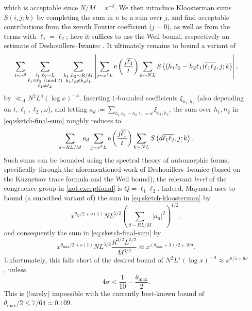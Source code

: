 \documentclass[reqno,11pt]{amsart}
\theoremstyle{definition}
\theoremstyle{remark}
\numberwithin{equation}{section}
\newcommand{\e}{\textnormal{e}}
\renewcommand{\bar}{\overline}
\renewcommand{\pmod}[1]{\ (\textnormal{mod } #1)}
\begin{document}
which is acceptable since $N/M = x^{-\delta}$.
We then introduce Kloosterman sums $S(i, j; k)$ by completing the sum in $n$ to a sum over $j$, and find acceptable contributions from the zeroth Fourier coefficient ($j = 0$), as well as from the terms with $\ell_1 = \ell_2$; here it suffices to use the Weil bound, respectively an estimate of Deshouillers--Iwaniec \cite[Theorem 9]{deshouillers1982kloosterman}. It ultimately remains to bound a variant of
\begin{equation} \label{eq:sketch-final-sum}
    \sum_{t \sim x^\delta}
    \sum_{\substack{\ell_1, \ell_2 \sim L \\ \ell_1 \equiv \ell_2 \pmod{t} \\ \ell_1 \neq \ell_2}}
    \sum_{\substack{h_1, h_2 \sim R/M \\ h_1\ell_2 \neq h_2\ell_1}}
    \left\vert
    \sum_{j \sim x^\delta L} \e\left(\frac{j\bar{\ell_1}}{t}\right)  
    \sum_{k \sim NL}
    S\left((h_1\ell_2 - h_2\ell_1)\bar{\ell_1\ell_2}, j; k\right)\right\vert,
\end{equation}
by $\ll_A N^2 L^4 (\log x)^{-A}$. Inserting $1$-bounded coefficients $\xi_{h_1, h_2}$ (also depending on $t, \ell_1, \ell_2, \omega$), and letting $a_d := \sum_{h_1 \ell_2 - h_2 \ell_1 = d} \xi_{h_1, h_2}$, the sum over $h_1, h_2$ in \cref{eq:sketch-final-sum} roughly reduces to
\begin{equation} \label{eq:sketch-kloosterman}
    \sum_{d \sim RL/M} a_d \sum_{j \sim x^\delta L} \e\left(\frac{j\bar{\ell_1}}{t}\right) 
    \sum_{k \sim NL} S\left(d \bar{\ell_1 \ell_2}, j; k\right).
\end{equation}
Such sums can be bounded using the spectral theory of automorphic forms, specifically through the aforementioned work of Deshouillers--Iwaniec \cite{deshouillers1982kloosterman} (based on the Kuznetsov trace formula and the Weil bound); the relevant \emph{level} of the congruence group in \cref{not:exceptional} is $Q = \ell_1\ell_2$. Indeed, Maynard \cite{maynard2020primes} uses \cite[Theorem 9]{deshouillers1982kloosterman} to bound (a smoothed variant of) the sum in \cref{eq:sketch-kloosterman} by
\[
    x^{\theta_Q/2 + o(1)} NL^{5/2} \left(\sum_{d \sim RL/M} |a_d|^2\right)^{1/2},
\]
and consequently the sum in \cref{eq:sketch-final-sum} by
\begin{equation} \label{eq:sketch-final-bound}
    x^{\theta_{\max}/2 + o(1)} NL^{5/2} \frac{R^{3/2}L^{3/2}}{M^{3/2}} 
    \approx 
    x^{(\theta_{\max}+3)/2 + 10\sigma}.
\end{equation}
Unfortunately, this falls short of the desired bound of $N^2 L^4 (\log x)^{-A} \approx x^{8/5 + 6\sigma}$, unless
\begin{equation} \label{eq:sketch-sigma}
    4\sigma < \frac{1}{10} - \frac{\theta_{\max}}{2}.
\end{equation}
This is (barely) impossible with the currently best-known bound of $\theta_{\max}/2 \le 7/64 \approx 0.109$.
\end{document}
